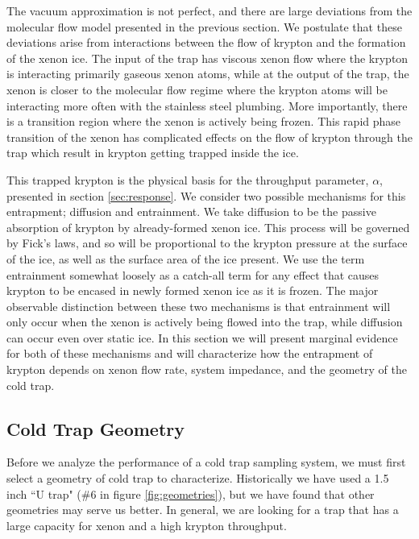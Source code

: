 \documentclass[12pt]{article}
\begin{document}
The vacuum approximation is not perfect, and there are large deviations from the molecular flow model presented in the previous section. We postulate that these deviations arise from interactions between the flow of krypton and the formation of the xenon ice. The input of the trap has viscous xenon flow where the krypton is interacting primarily gaseous xenon atoms, while at the output of the trap, the xenon is closer to the molecular flow regime where the krypton atoms will be interacting more often with the stainless steel plumbing. More importantly, there is a transition region where the xenon is actively being frozen. This rapid phase transition of the xenon has complicated effects on the flow of krypton through the trap which result in krypton getting trapped inside the ice. 

This trapped krypton is the physical basis for the throughput parameter, $\alpha$, presented in section \ref{sec:response}. We consider two possible mechanisms for this entrapment; diffusion and entrainment. We take diffusion to be the passive absorption of krypton by already-formed xenon ice. This process will be governed by Fick's laws, and so will be proportional to the krypton pressure at the surface of the ice, as well as the surface area of the ice present. We use the term entrainment somewhat loosely as a catch-all term for any effect that causes krypton to be encased in newly formed xenon ice as it is frozen. The major observable distinction between these two mechanisms is that entrainment will only occur when the xenon is actively being flowed into the trap, while diffusion can occur even over static ice. In this section we will present marginal evidence for both of these mechanisms and will characterize how the entrapment of krypton depends on xenon flow rate, system impedance, and the geometry of the cold trap.


\subsection{Cold Trap Geometry}
\label{sec:geometry}
Before we analyze the performance of a cold trap sampling system, we must first select a geometry of cold trap to characterize. Historically we have used a 1.5 inch ``U trap" (\#6 in figure \ref{fig:geometries}), but we have found that other geometries may serve us better. In general, we are looking for a trap that has a large capacity for xenon and a high krypton throughput.
\end{document}
